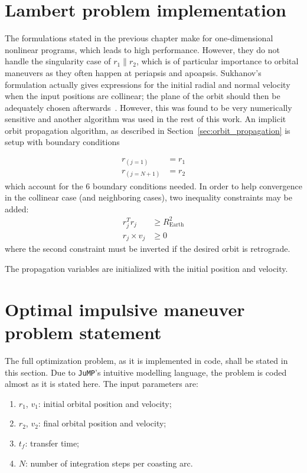 \section{Lambert problem implementation}

The formulations stated in the previous chapter make for one-dimensional nonlinear programs, which leads to high performance. However, they do not handle the singularity case of \(r_1 \parallel r_2\), which is of particular importance to orbital maneuvers as they often happen at periapsis and apoapsis. Sukhanov's formulation actually gives expressions for the initial radial and normal velocity when the input positions are collinear; the plane of the orbit should then be adequately chosen afterwards~\cite{sukhanov}. However, this was found to be very numerically sensitive and another algorithm was used in the rest of this work. An implicit orbit propagation algorithm, as described in Section~\ref{sec:orbit_propagation} is setup with boundary conditions

\begin{align}
    r_{(j=1)} &= r_1 \\
    r_{(j=N+1)} &= r_2
\end{align}
which account for the 6 boundary conditions needed. In order to help convergence in the collinear case (and neighboring cases), two inequality constraints may be added:
\begin{align}
    r_j^T r_j &\geq R_{\text{Earth}}^2 \\
    r_j \times v_j &\geq 0
\end{align}
where the second constraint must be inverted if the desired orbit is retrograde. 

The propagation variables are initialized with the initial position and velocity.

\section{Optimal impulsive maneuver problem statement}\label{sec:impulsive_statement}

The full optimization problem, as it is implemented in code, shall be stated in this section. Due to \texttt{JuMP}'s intuitive modelling language, the problem is coded almost as it is stated here. The input parameters are:
\begin{enumerate}
    \item \(r_1\), \(v_1\): initial orbital position and velocity;
    \item \(r_2\), \(v_2\): final orbital position and velocity;
    \item \(t_f\): transfer time;
    \item \(N\): number of integration steps per coasting arc.
\end{enumerate}

